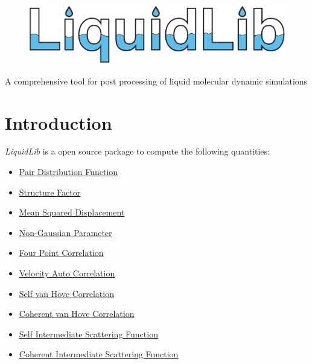 \documentclass{article}
\begin{document}
	\begin{figure}
		\centering
		\includegraphics[width=.9\textwidth]{./images/LiquidLib_logo.pdf}
	\end{figure}
{
\centering
\Large A comprehensive tool for post processing of liquid molecular dynamic simulations
}
\newpage

\section{Introduction}
\textit{LiquidLib} is a open source package to compute the following quantities:
\begin{itemize}
	\item \hyperref[sec::gofr]{Pair Distribution Function}
	\item \hyperref[sec::sofk]{Structure Factor}
	\item \hyperref[sec::MSD]{Mean Squared Displacement}
	\item \hyperref[sec::alpha2]{Non-Gaussian Parameter}
	\item \hyperref[sec::chi4]{Four Point Correlation}
	\item \hyperref[sec::VACF]{Velocity Auto Correlation}
	\item \hyperref[sec::Gofrt]{Self van Hove Correlation}
	\item \hyperref[sec::Grt]{Coherent van Hove Correlation}
	\item \hyperref[sec::Fsqt]{Self Intermediate Scattering Function}
	\item \hyperref[sec::Fqt]{Coherent Intermediate Scattering Function}
\end{itemize}
\end{document}
